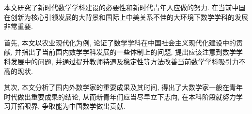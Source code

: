 本文研究了新时代数学学科建设的必要性和新时代青年人应做的努力. 在当前中国在创新为核心引领发展的大背景和国际上中美关系不佳的大环境下数学学科的发展非常重要.

首先, 本文以农业现代化为例, 论证了数学学科在中国社会主义现代化建设中的贡献, 并指出了当前国内数学学科发展的一些体制上的问题, 提出应该注意到数学学科发展中的问题, 并通过提升教师待遇及稳定性等方法改善当前数学学科吸引力不高的现状.

其次, 本文分析了国内外数学家的重要成果及其时间, 得出了大数学家一般在青年时代做出重要成果的结论, 从而新青年们应当尽早立下志向, 在本科阶段就努力学习开拓眼界, 争取能为中国数学做出贡献.
